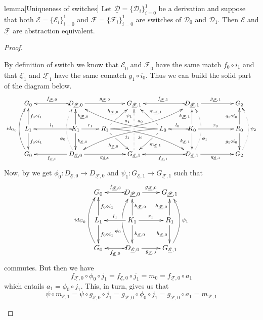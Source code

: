 \documentclass[a4paper,UKenglish,cleveref,pdftex, thm-restate,numberwithinsect]{lipics}
\newcommand{\id}[1]{\mathsf{id}_{#1}}
\newcommand{\dder}[1]{\mathscr{#1}}
\newcommand{\der}[1]{\underline{\dder{#1}}}
\begin{document}
\begin{theoremEnd}[category=sec3]{lemma}[Uniqueness of switches]\label{thm:switch_uni} Let $\der{D}=\{\dder{D}_{i}\}_{i=0}^1$ be a derivation and suppose that both $\der{E}=\{\dder{E}_i\}_{i=0}^1$  and $\der{F}=\{\dder{F}_i\}_{i=0}^1$ are switches of $\dder{D}_0$ and $\dder{D}_1$. Then $\der{E}$ and $\der{F}$ are abstraction equivalent.
\end{theoremEnd}
\begin{proof}
	\begin{proofEnd}		
		By definition of switch we know that $\der{E}_0$ and $\der{F}_0$ have the same match $f_0\circ i_1$ and that $\der{E}_1$ and $\der{F}_1$ have the same comatch $g_1\circ i_0$. Thus we can build the solid part of the diagram below.
		\[\xymatrix@C=22pt{G_{0} && \ar@{>->}[ll]_{f_{\der{F},0}} D_{\der{F},0} \ar[rr]^{g_{\der{F},0}}&& G_{\der{F},1} && \ar@{>->}[ll]_{f_{\der{F},1}} D_{\der{F},1} \ar[rr]^{g_{\der{F},1}}&& G_{2}\\L_1 \ar[d]^{f_0\circ i_1} \ar[u]_{f_0\circ i_1}&& K_{1} \ar[d]^{k_{\der{E},0}} \ar[u]_{k_{\der{F},0}}\ar@{>->}[ll]_{l_1} \ar[r]^{r_1} & R_{1} \ar@/^.35cm/[drrr]|(.3)\hole_(.4){j_0} \ar[dr]|(.3)\hole_{h_{\der{E},0}} \ar@/_.35cm/[urrr]|(.3)\hole^(.4){a_0} \ar[ur]|(.3)\hole^{h_{\der{F},0}}& &L_{0} \ar@/_.35cm/[dlll]^(.4){j_1} \ar[dl]|(.3)\hole^{m_{\der{E},1}} \ar@/^.35cm/[ulll]_(.4){a_1} \ar[ul]|(.3)\hole_{m_{\der{F},1}}& K_{0} \ar[d]_{k_{\der{E},1}} \ar[u]^{k_{\der{F},1}}\ar@{>->}[l]_{l_{0}} \ar[rr]^{r_0} && R_{0} \ar[d]_{g_1\circ i_0} \ar[u]^{g_1\circ i_0}\\ \ar@/^.5cm/[uu]^{\id{G_0}} G_{0} && \ar[ll]^{f_{\der{E},0}} D_{\der{E},0} \ar@{.>}@/^.5cm/[uu]^(.33){\phi_{0}}|\hole \ar[rr]_{g_{\der{E},0}}&& G_{\der{E},1} \ar@{.>}[uu]^(.76){\psi_1}|(.45)\hole |(.55)\hole&& \ar@{>->}[ll]^{f_{\der{E},1}} D_{\der{E},1} \ar@{.>}@/_.5cm/[uu]_(.33){\phi_{1}}|\hole\ar[rr]_{g_{\der{E},1}}&& G_{2}\ar@{.>}@/_.5cm/[uu]_{\psi_2}}\]
		Now, by  we get $\phi_0\colon D_{\der{E},0}\to D_{\der{F},0}$ and $\psi_1 \colon G_{\der{E},1}\to G_{\der{F},1}$ such that 
		\[\xymatrix{G_{0} & \ar@{>->}[l]_{f_{\der{F},0}} D_{\der{F},0} \ar[r]^{g_{\der{F},0}}& G_{\der{F},1} \\L_1 \ar[d]^{f_0\circ i_1} \ar[u]_{f_0\circ i_1}& K_{1} \ar[d]^{k_{\der{E},0}} \ar[u]_{k_{\der{F},0}}\ar[l]_{l_1} \ar[r]^{r_1} & R_{1}  \ar[d]_{h_{\der{E},0}}  \ar[u]^{h_{\der{F},0}}\\ \ar@/^.5cm/[uu]^{\id{G_0}} G_{0} & \ar@{>->}[l]^{f_{\der{E},0}} D_{\der{E},0} \ar@/^.5cm/[uu]^(.33){\phi_{0}}|\hole \ar[r]_{g_{\der{E},0}}& G_{\der{E},1} \ar@/_.5cm/[uu]_{\psi_1}}\]
		commutes. But then we have
		\[
		f_{\der{F},0}\circ \phi_0\circ j_1=f_{\der{E},0} \circ j_1=m_0=f_{\der{F},0}\circ a_1\]
		which entails $a_1= \phi_0\circ j_1$. This, in turn, gives us that
		\[\psi\circ m_{\der{E},1}=\psi \circ g_{\der{E},0}\circ j_1=g_{\der{F},0}\circ \phi_0\circ j_1=g_{\der{F},0}\circ a_1=m_{\der{F},1}\]
		

\end{proofEnd}
\end{proof}
\end{document}
